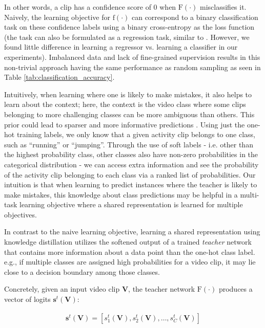 \documentclass[a4paper,conference]{IEEEtran}
\begin{document}
In other words, a clip has a confidence score of 0 when $\mathrm{F}(\cdot)$ misclassifies it. Naively, the learning objective for $\mathrm{f}(\cdot)$ can correspond to a binary classification task on these confidence labels using a binary cross-entropy as the loss function (the task can also be formulated as a regression task, similar to \cite{korbar2019scsampler}. However, we found little difference in learning a regressor vs. learning a classifier in our experiments). Imbalanced data and lack of fine-grained supervision results in this non-trivial approach having the same performance as random sampling as seen in Table \ref{tab:classification_accuracy}.

Intuitively, when learning where one is likely to make mistakes, it also helps to learn about the context; here, the context is the video class where some clips belonging to more challenging classes can be more ambiguous than others. This prior could lead to sparser and more informative predictions \cite{paredes2012exploiting}. Using just the one-hot training labels, we only know that a given activity clip belongs to one class, such as \enquote{running} or \enquote{jumping}. Through the use of soft labels  \cite{hinton2015distilling} - i.e. other than the highest probability class, other classes also have non-zero probabilities in the categorical distribution - we can access extra information and see the probability of the activity clip belonging to each class via a ranked list of probabilities. Our intuition is that when learning to predict instances where the teacher is likely to make mistakes, this knowledge about class predictions may be helpful in a multi-task learning \cite{caruana1997multitask} objective where a shared representation is learned for multiple objectives.

In contrast to the naive learning objective, learning a shared representation using knowledge distillation utilizes the softened output of a trained \textit{teacher} network that contains more information about a data point than the one-hot class label. e.g., if multiple classes are assigned high probabilities for a video clip, it may lie close to a decision boundary among those classes. 

Concretely, given an input video clip $\mathbf{V}$, the teacher network $\mathrm{F}(\cdot)$ produces a vector of logits $\mathbf{s}^t(\mathbf{V})$:

\begin{eqnarray}
\mathbf{s}^t(\mathbf{V}) = [s^t_1(\mathbf{V}), s^t_2(\mathbf{V}), \ldots, s^t_C(\mathbf{V})]
\end{eqnarray}
\end{document}
